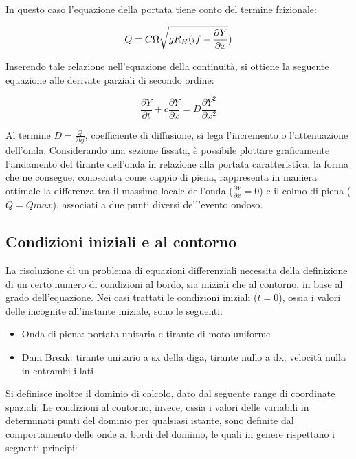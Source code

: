 \documentclass[12pt]{article} %
\begin{document}
\noindent In questo caso l’equazione della portata tiene conto del termine frizionale:

\begin{equation}
    Q=C\Omega\sqrt{gR\textsubscript{$H$}(if-\frac{\partial Y}{\partial x}})
\end{equation}

\noindent Inserendo tale relazione nell’equazione della continuità, si ottiene la seguente equazione alle derivate parziali di secondo ordine:

\begin{equation}
\frac{\partial Y}{\partial t}+c\frac{\partial Y}{\partial x}=D\frac{\partial Y^2}{\partial x^2}
\end{equation}

\noindent Al termine $D=\frac{Q}{2bj}$, coefficiente di diffusione, si lega l’incremento o l’attenuazione dell’onda.
Considerando una sezione fissata, è possibile plottare graficamente l’andamento del tirante dell’onda in relazione alla portata caratteristica; la forma che ne consegue, conosciuta come cappio di piena, rappresenta in maniera ottimale la differenza tra il massimo locale dell’onda ($\frac{\partial Y}{\partial x} = 0$) e il colmo di piena ($Q=Qmax$), associati a due punti diversi dell’evento ondoso.

\subsection{Condizioni iniziali e al contorno}
\noindent La risoluzione di un problema di equazioni differenziali necessita della definizione di un certo numero di condizioni al bordo, sia iniziali che al contorno, in base al grado dell’equazione.
Nei casi trattati le condizioni iniziali ($t=0$), ossia i valori delle incognite all’instante iniziale, sono le seguenti:

\begin{itemize}
\item Onda di piena: portata unitaria e tirante di moto uniforme
\item Dam Break: tirante unitario a sx della diga, tirante nullo a dx, velocità nulla in entrambi i lati
\end{itemize}

\noindent Si definisce inoltre il dominio di calcolo, dato dal seguente range di coordinate spaziali:
Le condizioni al contorno, invece, ossia i valori delle variabili in determinati punti del dominio per qualsiasi istante, sono definite dal comportamento delle onde ai bordi del dominio, le quali in genere rispettano i seguenti principi:
\end{document}
